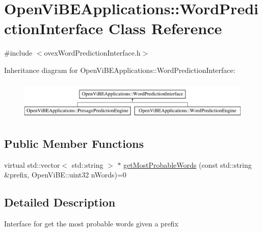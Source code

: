\hypertarget{classOpenViBEApplications_1_1WordPredictionInterface}{
\section{OpenViBEApplications::WordPredictionInterface Class Reference}
\label{classOpenViBEApplications_1_1WordPredictionInterface}
}


{\ttfamily \#include $<$ovexWordPredictionInterface.h$>$}

Inheritance diagram for OpenViBEApplications::WordPredictionInterface:\begin{figure}[H]
\begin{center}
\leavevmode
\includegraphics[height=1.885522cm]{classOpenViBEApplications_1_1WordPredictionInterface}
\end{center}
\end{figure}
\subsection*{Public Member Functions}
\begin{DoxyCompactItemize}
\item 
virtual std::vector$<$ std::string $>$ $\ast$ \hyperlink{classOpenViBEApplications_1_1WordPredictionInterface_a9eb048db224c4d233bbfa8e3999a7b6c}{getMostProbableWords} (const std::string \&prefix, OpenViBE::uint32 nWords)=0
\end{DoxyCompactItemize}


\subsection{Detailed Description}
Interface for get the most probable words given a prefix 

